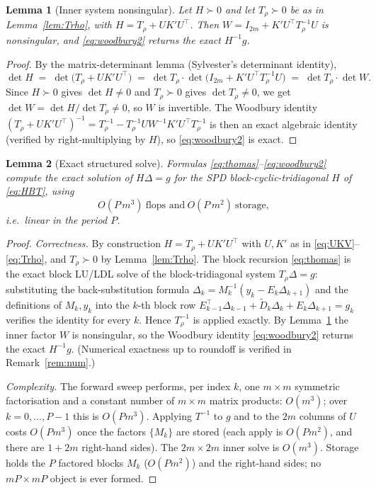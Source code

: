 \documentclass{amsart}
\newtheorem{lemma}{Lemma}
\begin{document}
\begin{lemma}[Inner system nonsingular]\label{lem:inner}
Let $H\succ0$ and let $T_\rho\succ0$ be as in Lemma~\ref{lem:Trho}, with
$H=T_\rho+UK'U^{\!\top}$. Then $W=I_{2m}+K'U^{\!\top}T_\rho^{-1}U$ is nonsingular, and
\eqref{eq:woodbury2} returns the exact $H^{-1}g$.
\end{lemma}

\begin{proof}
By the matrix-determinant lemma (Sylvester's determinant identity),
\[
  \det H \;=\; \det\!\big(T_\rho+UK'U^{\!\top}\big)
        \;=\; \det T_\rho \cdot \det\!\big(I_{2m}+K'U^{\!\top}T_\rho^{-1}U\big)
        \;=\; \det T_\rho \cdot \det W .
\]
Since $H\succ0$ gives $\det H\neq0$ and $T_\rho\succ0$ gives $\det T_\rho\neq0$, we get
$\det W=\det H/\det T_\rho\neq0$, so $W$ is invertible. The Woodbury identity
$ (T_\rho+UK'U^{\!\top})^{-1}=T_\rho^{-1}-T_\rho^{-1}U W^{-1}K'U^{\!\top}T_\rho^{-1}$
is then an exact algebraic identity (verified by right-multiplying by $H$), so
\eqref{eq:woodbury2} is exact.
\end{proof}

\begin{lemma}[Exact structured solve]\label{lem:exact}
Formulas \eqref{eq:thomas}--\eqref{eq:woodbury2} compute the exact solution of
$H\Delta=g$ for the SPD block-cyclic-tridiagonal $H$ of \eqref{eq:HBT}, using
\[
  O(P\,m^3)\ \text{flops and}\ O(P\,m^2)\ \text{storage},
\]
i.e.\ \emph{linear} in the period $P$.
\end{lemma}

\begin{proof}
\emph{Correctness.} By construction $H=T_\rho+UK'U^{\!\top}$ with $U,K'$ as in
\eqref{eq:UKV}--\eqref{eq:Trho}, and $T_\rho\succ0$ by Lemma~\ref{lem:Trho}. The block
recursion \eqref{eq:thomas} is the exact block LU/LDL solve of the block-tridiagonal
system $T_\rho\Delta=g$: substituting the back-substitution formula
$\Delta_k=M_k^{-1}(y_k-E_k\Delta_{k+1})$ and the definitions of $M_k,y_k$ into the
$k$-th block row
$E_{k-1}^{\!\top}\Delta_{k-1}+\widetilde D_k\Delta_k+E_k\Delta_{k+1}=g_k$ verifies the
identity for every $k$. Hence $T_\rho^{-1}$ is applied exactly. By
Lemma~\ref{lem:inner} the inner factor $W$ is nonsingular, so the Woodbury identity
\eqref{eq:woodbury2} returns the exact $H^{-1}g$. (Numerical exactness up to roundoff
is verified in Remark~\ref{rem:num}.)

\emph{Complexity.} The forward sweep performs, per index $k$, one $m\times m$
symmetric factorisation and a constant number of $m\times m$ matrix products:
$O(m^3)$; over $k=0,\dots,P-1$ this is $O(Pm^3)$. Applying $T^{-1}$ to $g$ and to the
$2m$ columns of $U$ costs $O(Pm^3)$ once the factors $\{M_k\}$ are stored (each apply
is $O(Pm^2)$, and there are $1+2m$ right-hand sides). The $2m\times2m$ inner solve is
$O(m^3)$. Storage holds the $P$ factored blocks $M_k$ ($O(Pm^2)$) and the
right-hand sides; no $mP\times mP$ object is ever formed.
\end{proof}
\end{document}
